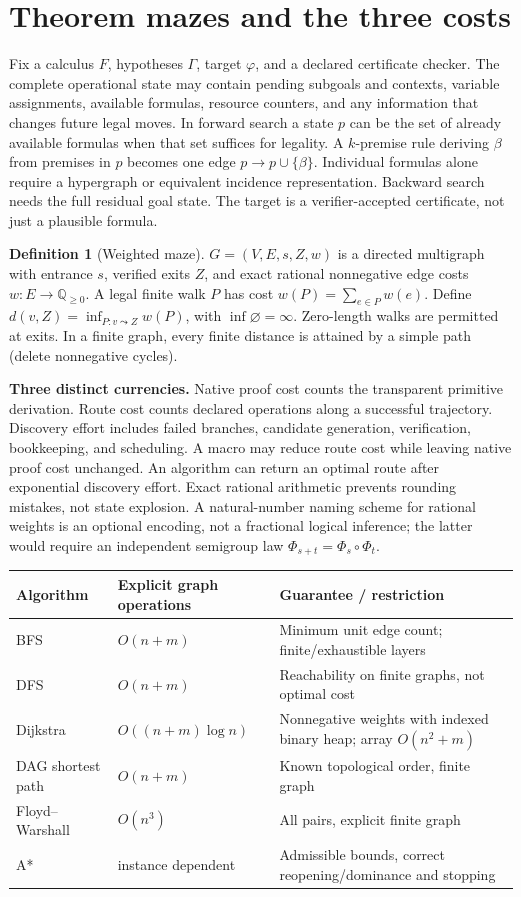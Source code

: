 \documentclass[11pt]{article}
\theoremstyle{definition}\newtheorem{definition}[theorem]{Definition}\newtheorem{example}[theorem]{Example}\newtheorem{conjecture}[theorem]{Conjecture}
\newcommand{\Q}{\mathbb Q}\newcommand{\N}{\mathbb N}\newcommand{\R}{\mathbb R}\newcommand{\E}{\mathbb E}\newcommand{\Prb}{\mathbb P}\newcommand{\Dep}{\operatorname{Dep}}\newcommand{\Ind}{\operatorname{Ind}}\newcommand{\Vfy}{\operatorname{Verify}}\newcommand{\supp}{\operatorname{supp}}\newcommand{\Fix}{\operatorname{Fix}}\newcommand{\eps}{\varepsilon}
\begin{document}
\section{Theorem mazes and the three costs}
Fix a calculus $F$, hypotheses $\Gamma$, target $\varphi$, and a declared certificate checker. The complete operational state may contain pending subgoals and contexts, variable assignments, available formulas, resource counters, and any information that changes future legal moves. In forward search a state $p$ can be the set of already available formulas when that set suffices for legality. A $k$-premise rule deriving $\beta$ from premises in $p$ becomes one edge $p\to p\cup\{\beta\}$. Individual formulas alone require a hypergraph or equivalent incidence representation. Backward search needs the full residual goal state. The target is a verifier-accepted certificate, not just a plausible formula.
\begin{definition}[Weighted maze]
$G=(V,E,s,Z,w)$ is a directed multigraph with entrance $s$, verified exits $Z$, and exact rational nonnegative edge costs $w:E\to\Q_{\ge0}$. A legal finite walk $P$ has cost $w(P)=\sum_{e\in P}w(e)$. Define $d(v,Z)=\inf_{P:v\leadsto Z}w(P)$, with $\inf\varnothing=\infty$. Zero-length walks are permitted at exits. In a finite graph, every finite distance is attained by a simple path (delete nonnegative cycles).
\end{definition}
\textbf{Three distinct currencies.} Native proof cost counts the transparent primitive derivation. Route cost counts declared operations along a successful trajectory. Discovery effort includes failed branches, candidate generation, verification, bookkeeping, and scheduling. A macro may reduce route cost while leaving native proof cost unchanged. An algorithm can return an optimal route after exponential discovery effort. Exact rational arithmetic prevents rounding mistakes, not state explosion. A natural-number naming scheme for rational weights is an optional encoding, not a fractional logical inference; the latter would require an independent semigroup law $\Phi_{s+t}=\Phi_s\circ\Phi_t$.
\begin{center}\small
\begin{tabularx}{\linewidth}{l l X}\toprule
Algorithm & Explicit graph operations & Guarantee / restriction\\\midrule
BFS & $O(n+m)$ & Minimum unit edge count; finite/exhaustible layers\\
DFS & $O(n+m)$ & Reachability on finite graphs, not optimal cost\\
Dijkstra & $O((n+m)\log n)$ & Nonnegative weights with indexed binary heap; array $O(n^2+m)$\\
DAG shortest path & $O(n+m)$ & Known topological order, finite graph\\
Floyd--Warshall & $O(n^3)$ & All pairs, explicit finite graph\\
A* & instance dependent & Admissible bounds, correct reopening/dominance and stopping\\\bottomrule
\end{tabularx}\end{center}
\end{document}
